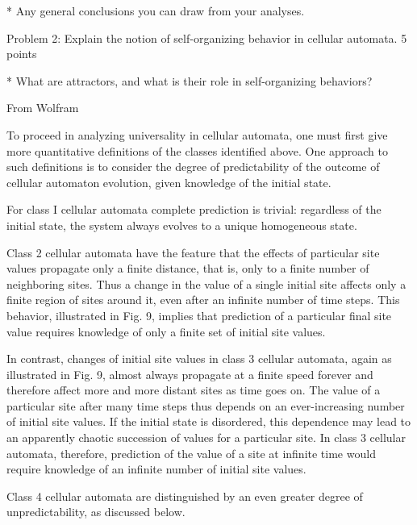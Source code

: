 * Any general conclusions you can draw from your analyses.

Problem 2: Explain the notion of self-organizing behavior in cellular automata.
5 points

* What are attractors, and what is their role in self-organizing behaviors?

From Wolfram

To proceed in analyzing universality in cellular automata, one must first give more
quantitative definitions of the classes identified above. 
One approach to such definitions is to consider the degree of predictability of
the outcome of cellular automaton evolution,
given knowledge of the initial state. 

For class I cellular automata complete prediction is trivial: 
regardless of the initial state, the system always evolves to 
a unique homogeneous state. 

Class 2 cellular automata have
the feature that the effects of particular site
values propagate only a finite distance, 
that is, only to a finite number of neighboring sites. 
Thus a change in the value of a single
initial site affects only a finite region of sites
around it, even after an infinite number of time steps. 
This behavior, illustrated in Fig. 9, 
implies that prediction of a particular final
site value requires knowledge of only a finite
set of initial site values. 

In contrast, changes of initial site values in 
class 3 cellular automata, again as illustrated in Fig. 9, 
almost always propagate at a finite speed forever
and therefore affect more and more distant
sites as time goes on. 
The value of a particular site after many time steps thus
depends on an ever-increasing number of initial site values. 
If the initial state is disordered, this dependence 
may lead to an apparently chaotic succession of values for a
particular site. 
In class 3 cellular automata, therefore, 
prediction of the value of a site at
infinite time would require knowledge of an
infinite number of initial site values. 

Class 4 cellular automata are distinguished by an
even greater degree of unpredictability, as
discussed below.

